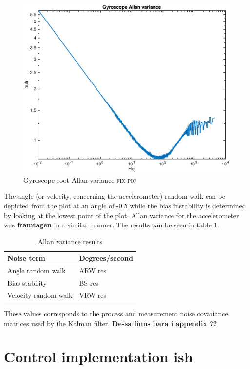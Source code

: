 \documentclass[a4paper,11pt]{kth-mag}
\begin{document}
\begin{figure}[!htb]
\centering
\includegraphics[scale=.7]{gyroscopeallan.eps}
\caption{Gyroscope root Allan variance \textsc{fix pic}}
\label{fig:gyroscope allan}
\end{figure}

The angle (or velocity, concerning the accelerometer) random walk can be depicted from the plot at an angle of -0.5 while the bias instability is determined by looking at the lowest point of the plot. Allan variance for the accelerometer was \textbf{framtagen} in a similar manner.  The results can be seen in table \ref{Table: Allan variance}.

\begin{table}[!hbt]
\centering
    \begin{tabular}{| l | l |} \hline
    Noise term & Degrees/second \\ \hline
    Angle random walk & ARW res \\ \hline
    Bias stability & BS res \\ \hline
    Velocity random walk & VRW res \\
    \hline
    \end{tabular}
    \caption{Allan variance results}
    \label{Table: Allan variance}
\end{table}

These values corresponds to the process and measurement noise covariance matrices used by the Kalman filter. \textbf{Dessa finns bara i appendix ??} 

\section{Control implementation ish}
\end{document}
